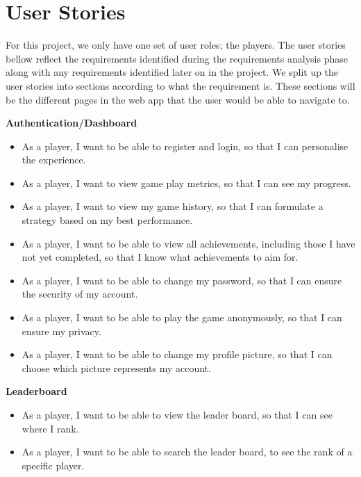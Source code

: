 \documentclass{l4proj}
\begin{document}
\section{User Stories}
For this project, we only have one set of user roles; the players. The user stories bellow reflect the requirements identified during the requirements analysis phase along with any requirements identified later on in the project. We split up the user stories into sections according to what the requirement is. These sections will be the different pages in the web app that the user would be able to navigate to.

\textbf{Authentication/Dashboard}
\begin{itemize}
    \item As a player, I want to be able to register and login, so that I can personalise the experience.
    \item As a player, I want to view game play metrics, so that I can see my progress.
    \item As a player, I want to view my game history, so that I can formulate a strategy based on my best performance.
    \item As a player, I want to be able to view all achievements, including those I have not yet completed, so that I know what achievements to aim for.
    \item As a player, I want to be able to change my password, so that I can ensure the security of my account.
    \item As a player, I want to be able to play the game anonymously, so that I can ensure my privacy.
    \item As a player, I want to be able to change my profile picture, so that I can choose which picture represents my account.
\end{itemize}

\textbf{Leaderboard}
\begin{itemize}
    \item As a player, I want to be able to view the leader board, so that I can see where I rank.
    \item As a player, I want to be able to search the leader board, to see the rank of a specific player.
\end{itemize}
\end{document}
